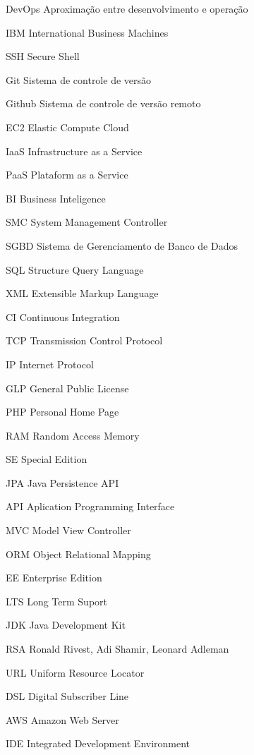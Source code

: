 \begin{siglas}
	\item[DevOps] Aproximação entre desenvolvimento e operação
	\item[IBM] International Business Machines
	\item[SSH] Secure Shell
	\item[Git] Sistema de controle de versão
	\item[Github] Sistema de controle de versão remoto
	\item[EC2] Elastic Compute Cloud
	\item[IaaS] Infrastructure as a Service
	\item[PaaS] Plataform as a Service
	\item[BI] Business Inteligence
	\item[SMC] System Management Controller
	\item[SGBD] Sistema de Gerenciamento de Banco de Dados
	\item[SQL] Structure Query Language
	\item[XML] Extensible Markup Language
	\item[CI] Continuous Integration
	\item[TCP] Transmission Control Protocol
	\item[IP] Internet Protocol
	\item[GLP] General Public License
	\item[PHP] Personal Home Page
	\item[RAM] Random Access Memory
	\item[SE] Special Edition
	\item[JPA] Java Persistence API
	\item[API] Aplication Programming Interface
	\item[MVC] Model View Controller
	\item[ORM] Object Relational Mapping
 	\item[EE] Enterprise Edition
 	\item[LTS] Long Term Suport
 	\item[JDK] Java Development Kit
 	\item[RSA] Ronald Rivest, Adi Shamir, Leonard Adleman
 	\item[URL] Uniform Resource Locator
 	\item[DSL] Digital Subscriber Line
 	\item[AWS] Amazon Web Server
 	\item[IDE] Integrated Development Environment
	
	
\end{siglas}